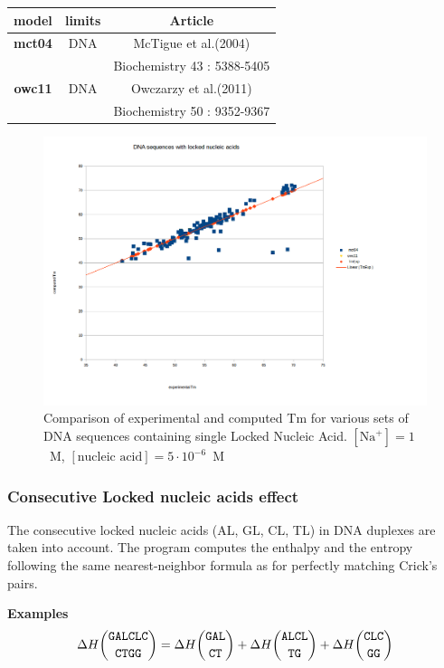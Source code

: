 \documentclass{article}
\begin{document}
\begin{table}[hc]
\begin{tabular}[h]{| c | c | c |}
\textbf{model} & \textbf{limits} & \textbf{Article} \\
\hline
\textbf{mct04} & DNA & McTigue et al.(2004)\\
 & & Biochemistry 43 : 5388-5405\\
\hline
\textbf{owc11} & DNA & Owczarzy et al.(2011)\\
 & & Biochemistry 50 : 9352-9367\\
\hline
\end{tabular}
\end{table}

\begin{figure}[h]
\includegraphics[width=1\linewidth]{images/LockedNucleicAcid}
\caption{Comparison of experimental and computed Tm for various sets of
 DNA sequences containing single Locked Nucleic Acid. $[\mbox{Na}^+] = 1$~M, $[\mbox{nucleic acid}] = 5\cdot{}10^{-6}$~M}
\end{figure}
\pagebreak

\subsubsection{Consecutive Locked nucleic acids effect}

The consecutive locked nucleic acids (AL, GL, CL, TL) in DNA duplexes are taken into account.
The program computes the enthalpy and the entropy following the same nearest-neighbor formula as for perfectly matching Crick's pairs.

\textbf{Examples}
\begin{multline*}
\Delta H {\mbox{\texttt{GALCLC}} \choose \mbox{\texttt{CTGG}}} = 
\Delta H {\mbox{\texttt{GAL}} \choose \mbox{\texttt{CT}}} +
\Delta H {\mbox{\texttt{ALCL}} \choose \mbox{\texttt{TG}}} +
\Delta H {\mbox{\texttt{CLC}} \choose \mbox{\texttt{GG}}} \\ 
\end{multline*}
       
\end{document}
